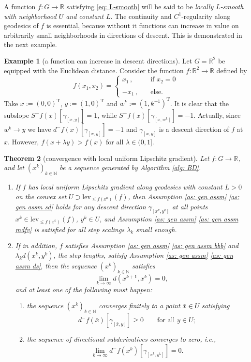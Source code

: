 \documentclass{article}
\theoremstyle{plain}\newtheorem{theorem}{Theorem}[section]
\theoremstyle{plain}\newtheorem{definition}[theorem]{Definition}
\theoremstyle{plain}\newtheorem{lemma}[theorem]{Lemma}
\theoremstyle{definition}\newtheorem{remark}[theorem]{Remark}
\theoremstyle{definition}\newtheorem{example}[theorem]{Example}
\theoremstyle{plain}\newtheorem{proposition}[theorem]{Proposition}
\theoremstyle{plain}\newtheorem{inference}[theorem]{Inference}
\theoremstyle{plain}\newtheorem{corollary}[theorem]{Corollary}
\theoremstyle{plain}\newtheorem{assumption}[theorem]{Assumption}
\newcommand{\xbar}{\bar{x}}
\newcommand{\bbR}{\mathbb{R}}
\newcommand{\bbN}{\mathbb{N}}
\begin{document}
A function $f:G\to\mathbb{R}$ satisfying \eqref{eq: L-smooth} will be said to be {\em locally $L$-smooth with neighborhood $U$ and constant $L$}. The continuity and $C^1$-regularity along geodesics of $f$ is essential, because without it functions can increase in value on arbitrarily small neighborhoods in directions of descent. This is demonstrated in the next example.
\begin{example}[a function can increase in descent directions]
    Let $G=\mathbb{R}^2$ be equipped with the Euclidean distance. Consider the function $f:\mathbb{R}^2\to\mathbb{R}$ defined by
    $$
    f(x_1,x_2)=\begin{cases}
        x_1\,,&\quad\text{if}\,\,x_2=0\\
        \\
        -x_1\,,&\quad\text{else.}
    \end{cases}
    $$
    Take $x:=(0,0)^{\mathrm{T}}$, $y:=(1,0)^{\mathrm{T}}$ and $w^k:=(1,k^{-1})^{\mathrm{T}}$. It is clear that the subslope $S^-f(x)[\gamma_{[x,y]}]=1$, while $S^-f(x)[\gamma_{[x,w^k]}]=-1$. Actually, since $w^k\to y$ we have $d^-f(x)[\gamma_{[x,y]}]=-1$ and $\gamma_{[x,y]}$ is a descent direction of $f$ at $x$. However, $f(x+\lambda y)>f(x)$ for all $\lambda\in(0,1]$.
\end{example}
\begin{theorem}[convergence with local uniform Lipschitz gradient]\label{th: BD with unif L-gradient}
    Let $f:G\to\bbR$, and let $(x^k)_{k\in\bbN}$ be a sequence generated by Algorithm \ref{alg: BD}.
    \begin{enumerate}
        \item[(i)] If $f$ has local uniform Lipschitz gradient along geodesics with constant $L>0$ on the convex set $U\supset\mathrm{lev}_{\leq f(x^0)}(f)$, then Assumption \ref{as: gen assm} \eqref{as: gen assm sd} holds for any descent direction $\gamma_{[x^k,y^k]}$ at all points $x^k\in\mathrm{lev}_{\leq f(x^0)}(f)$, $y^k\in U$, and Assumption \ref{as: gen assm} \eqref{as: gen assm mdfv} is satisfied for all step scalings $\lambda_k$ small enough.
        \item[(ii)] If in addition, $f$ satisfies Assumption \ref{as: gen assm} \eqref{as: gen assm bbb} and $\lambda_kd(x^k,y^k)$, the step lengths, satisfy Assumption \ref{as: gen assm} \eqref{as: gen assm ds}, then the sequence $(x^k)_{k\in\bbN}$ satisfies
        $$
        \lim_{k\to\infty}d(x^{k+1},x^k)=0,
        $$
        and at least one of the following must happen:
        \begin{enumerate}
            \item[(a)] the sequence $(x^k)_{k\in\bbN}$ converges finitely to a point $\xbar\in U$ satisfying
            $$
            d^-f(\xbar)[\gamma_{[\xbar, y]}]\geq 0 \qquad\text{for all}\,\,y\in U;
            $$
            \item[(b)] the sequence of directional subderivatives converges to zero, i.e.,
            $$
            \lim_{k\to\infty} d^-f(x^k)[\gamma_{[x^k, y^k]}]=0.
            $$
        \end{enumerate}
    \end{enumerate}
\end{theorem}
\end{document}
